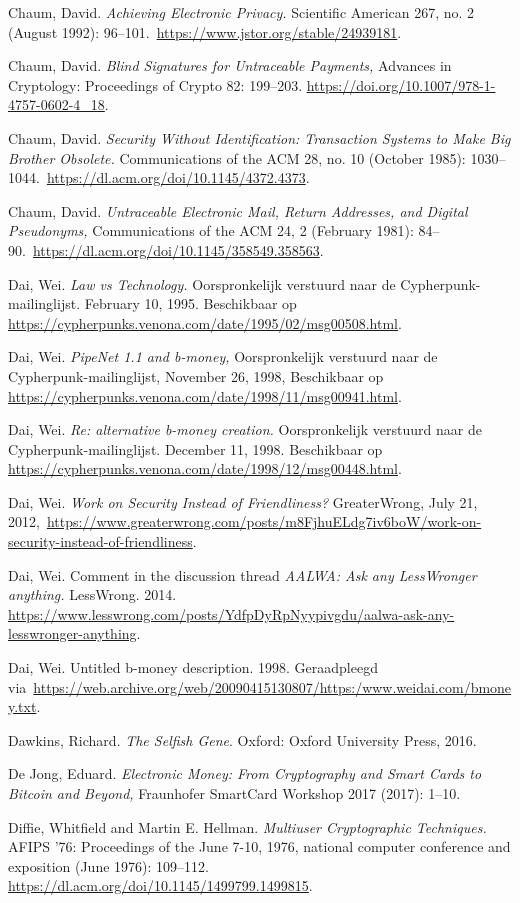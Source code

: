 \documentclass[
  a5paper,
  smalldemyvopaper,11pt,twoside,onecolumn,openright,extrafontsizes,
hidelinks]{memoir}
\begin{document}
Chaum, David. \emph{Achieving Electronic Privacy.} Scientific American
267, no. 2 (August 1992):
96--101.~\url{https://www.jstor.org/stable/24939181}.

Chaum, David. \emph{Blind Signatures for Untraceable Payments,} Advances
in Cryptology: Proceedings of Crypto 82: 199--203.
\url{https://doi.org/10.1007/978-1-4757-0602-4_18}.

Chaum, David. \emph{Security Without Identification: Transaction Systems
to Make Big Brother Obsolete.} Communications of the ACM 28, no. 10
(October 1985):
1030--1044.~\url{https://dl.acm.org/doi/10.1145/4372.4373}.

Chaum, David. \emph{Untraceable Electronic Mail, Return Addresses, and
Digital Pseudonyms,} Communications of the ACM 24, 2 (February 1981):
84--90.~\url{https://dl.acm.org/doi/10.1145/358549.358563}.

Dai, Wei. \emph{Law vs Technology.} Oorspronkelijk verstuurd naar de
Cypherpunk-mailinglijst. February 10, 1995. Beschikbaar op
\url{https://cypherpunks.venona.com/date/1995/02/msg00508.html}.

Dai, Wei. \emph{PipeNet 1.1 and b-money,} Oorspronkelijk verstuurd naar
de Cypherpunk-mailinglijst, November 26, 1998, Beschikbaar op
\url{https://cypherpunks.venona.com/date/1998/11/msg00941.html}.

Dai, Wei. \emph{Re: alternative b-money creation.} Oorspronkelijk
verstuurd naar de Cypherpunk-mailinglijst. December 11, 1998.
Beschikbaar op
\url{https://cypherpunks.venona.com/date/1998/12/msg00448.html}.

Dai, Wei. \emph{Work on Security Instead of Friendliness?} GreaterWrong,
July 21,
2012,~\url{https://www.greaterwrong.com/posts/m8FjhuELdg7iv6boW/work-on-security-instead-of-friendliness}.

Dai, Wei. Comment in the discussion thread \emph{AALWA: Ask any
LessWronger anything.} LessWrong. 2014.
\url{https://www.lesswrong.com/posts/YdfpDyRpNyypivgdu/aalwa-ask-any-lesswronger-anything}.

Dai, Wei. Untitled b-money description. 1998. Geraadpleegd
via~\url{https://web.archive.org/web/20090415130807/https:/www.weidai.com/bmoney.txt}.

Dawkins, Richard. \emph{The Selfish Gene}. Oxford: Oxford University
Press, 2016.

De Jong, Eduard. \emph{Electronic Money: From Cryptography and Smart
Cards to Bitcoin and Beyond,} Fraunhofer SmartCard Workshop 2017 (2017):
1--10.

Diffie, Whitfield and Martin E. Hellman. \emph{Multiuser Cryptographic
Techniques.} AFIPS '76: Proceedings of the June 7-10, 1976, national
computer conference and exposition (June 1976): 109--112.
\url{https://dl.acm.org/doi/10.1145/1499799.1499815}.
\end{document}
